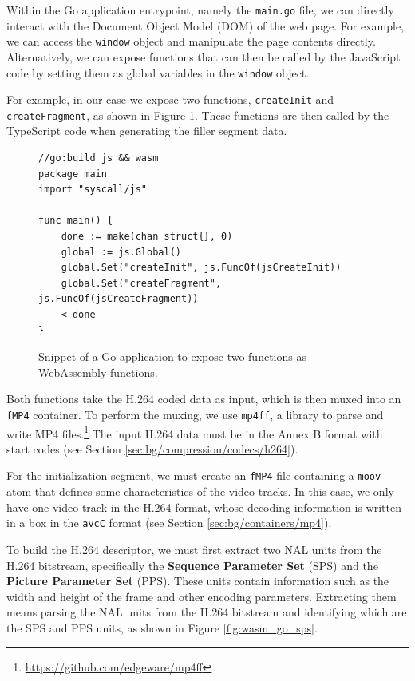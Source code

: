 Within the Go application entrypoint, namely the \texttt{main.go} file, we can directly interact with the Document Object Model (DOM) of the web page. For example, we can access the \texttt{window} object and manipulate the page contents directly. Alternatively, we can expose functions that can then be called by the JavaScript code by setting them as global variables in the \texttt{window} object.

For example, in our case we expose two functions, \texttt{createInit} and \texttt{createFragment}, as shown in Figure \ref{fig:wasm_go_main}. These functions are then called by the TypeScript code when generating the filler segment data.

\begin{figure}[h]
    \centering
    \begin{verbatim}
//go:build js && wasm
package main
import "syscall/js"

func main() {
	done := make(chan struct{}, 0)
	global := js.Global()
	global.Set("createInit", js.FuncOf(jsCreateInit))
	global.Set("createFragment", js.FuncOf(jsCreateFragment))
	<-done
}
    \end{verbatim}
    \caption{Snippet of a Go application to expose two functions as WebAssembly functions.}
    \label{fig:wasm_go_main}
\end{figure}

Both functions take the H.264 coded data as input, which is then muxed into an \texttt{fMP4} container. To perform the muxing, we use \texttt{mp4ff}, a library to parse and write MP4 files.\footnote{\url{https://github.com/edgeware/mp4ff}} The input H.264 data must be in the Annex B format with start codes (see Section \ref{sec:bg/compression/codecs/h264}).

For the initialization segment, we must create an \texttt{fMP4} file containing a \texttt{moov} atom that defines some characteristics of the video tracks. In this case, we only have one video track in the H.264 format, whose decoding information is written in a box in the \texttt{avcC} format (see Section \ref{sec:bg/containers/mp4}).

To build the H.264 descriptor, we must first extract two NAL units from the H.264 bitstream, specifically the \textbf{Sequence Parameter Set} (SPS) and the \textbf{Picture Parameter Set} (PPS). These units contain information such as the width and height of the frame and other encoding parameters. Extracting them means parsing the NAL units from the H.264 bitstream and identifying which are the SPS and PPS units, as shown in Figure \ref{fig:wasm_go_sps}.

